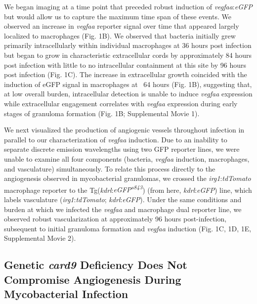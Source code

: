 We began imaging at a time point that preceded robust induction of \textit{vegfaa}:\textit{eGFP} but would allow us to capture the maximum time span of these events. We observed an increase in \textit{vegfaa} reporter signal over time that appeared largely localized to macrophages (Fig. 1B). We observed that bacteria initially grew primarily intracellularly within individual macrophages at 36 hours post infection but began to grow in characteristic extracellular cords by approximately 84 hours post infection with little to no intracellular containment at this site by 96 hours post infection (Fig. 1C). The increase in extracellular growth coincided with the induction of eGFP signal in macrophages at ~64 hours (Fig. 1B), suggesting that, at low overall burden, intracellular detection is unable to induce \textit{vegfaa} expression while extracellular engagement correlates with \textit{vegfaa} expression during early stages of granuloma formation (Fig. 1B; Supplemental Movie 1). 

We next visualized the production of angiogenic vessels throughout infection in parallel to our characterization of \textit{vegfaa} induction. Due to an inability to separate discrete emission wavelengths using two GFP reporter lines, we were unable to examine all four components (bacteria, \textit{vegfaa} induction, macrophages, and vasculature) simultaneously. To relate this process directly to the angiogenesis observed in mycobacterial granulomas, we crossed the \textit{irg1}:\textit{tdTomato} macrophage reporter to the Tg(\textit{kdrl}:\textit{eGFP\textsuperscript{s843}}) (from here, \textit{kdrl}:\textit{eGFP}) line, which labels vasculature (\textit{irg1}:\textit{tdTomato}; \textit{kdrl}:\textit{eGFP}). Under the same conditions and burden at which we infected the \textit{vegfaa} and macrophage dual reporter line, we observed robust vascularization at approximately 96 hours post-infection, subsequent to initial granuloma formation and \textit{vegfaa} induction (Fig. 1C, 1D, 1E, Supplemental Movie 2). 

\subsection{Genetic \textit{card9} Deficiency Does Not Compromise Angiogenesis During Mycobacterial Infection}

